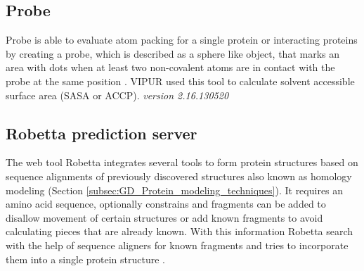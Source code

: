 \subsection{Probe}
Probe is able to evaluate atom packing for a single protein or interacting proteins by creating a probe, which is described as a sphere like object, that marks an area with dots when at least two non-covalent atoms are in contact with the probe at the same position \cite{word_visualizing_1999, richardson_lab_probe_nodate}. VIPUR used this tool to calculate solvent accessible surface area (SASA or ACCP).
\label{subsec:MM_Probe}
\newline
\textit{version 2.16.130520}

\subsection{Robetta prediction server}
The web tool Robetta integrates several tools to form protein structures based on sequence alignments of previously discovered structures also known as homology modeling (Section \ref{subsec:GD_Protein_modeling_techniques}).
It requires an amino acid sequence, optionally constrains and fragments can be added to disallow movement of certain structures or add known fragments to avoid calculating pieces that are already known. With this information Robetta search with the help of sequence aligners for known fragments and tries to incorporate them into a single protein structure \cite{song_high-resolution_2013,soding_protein_2005,kallberg_template-based_2012,yang_improving_2011,ovchinnikov_protein_2017}.
\label{subsec:MM_Robetta}

